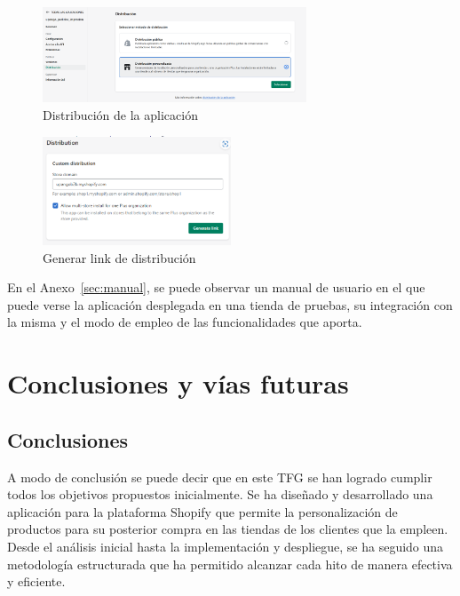 \documentclass[11pt]{article}
\begin{document}
\begin{figure}[H]
    \centering
    \includegraphics[width=0.7\textwidth]{imagenes/distribucionAppEnlace.png}
    \caption{\label{fig:DistributionAppPartners}Distribución de la aplicación}
    \vspace{\fill}
\end{figure}

\begin{figure}[H]
    \centering
    \includegraphics[width=0.5\textwidth]{imagenes/generarLinkDistribution.png}
    \caption{\label{fig:generarLinkDistribution}Generar link de distribución}
    \vspace{\fill}
\end{figure}

En el Anexo~\ref{sec:manual}, se puede observar un manual de usuario en el que puede verse la aplicación desplegada en una tienda de pruebas, su integración
con la misma y el modo de empleo de las funcionalidades que aporta.

\clearpage
\section{Conclusiones y vías futuras}

\subsection{Conclusiones}
A modo de conclusión se puede decir que en este TFG se han logrado cumplir todos
los objetivos propuestos inicialmente. Se ha diseñado y desarrollado una aplicación para la plataforma Shopify que 
permite la personalización de productos para su posterior compra en las tiendas de los clientes que la empleen.
Desde el análisis inicial hasta la implementación y despliegue, se ha seguido una metodología estructurada que ha permitido
alcanzar cada hito de manera efectiva y eficiente.
\end{document}
